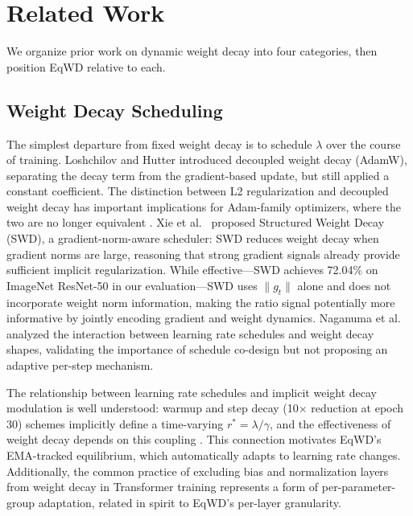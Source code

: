 \documentclass{article}
\begin{document}
\section{Related Work}
\label{sec:related}

We organize prior work on dynamic weight decay into four categories,
then position EqWD relative to each.

\subsection{Weight Decay Scheduling}
\label{sec:related_scheduling}

The simplest departure from fixed weight decay is to schedule
$\lambda$ over the course of training. Loshchilov and Hutter
\citep{loshchilov2019adamw} introduced decoupled weight decay (AdamW),
separating the decay term from the gradient-based update, but still
applied a constant coefficient. The distinction between L2
regularization and decoupled weight decay has important implications for
Adam-family optimizers, where the two are no longer equivalent
\citep{loshchilov2019adamw}. Xie et al.~\citep{xie2023swd} proposed
Structured Weight Decay (SWD), a gradient-norm-aware scheduler: SWD
reduces weight decay when gradient norms are large, reasoning that
strong gradient signals already provide sufficient implicit
regularization. While effective---SWD achieves 72.04\% on ImageNet
ResNet-50 in our evaluation---SWD uses $\|g_t\|$ alone and does not
incorporate weight norm information, making the ratio signal potentially
more informative by jointly encoding gradient and weight dynamics.
Naganuma et al.~\citep{naganuma2026} analyzed the interaction between
learning rate schedules and weight decay shapes, validating the
importance of schedule co-design but not proposing an adaptive per-step
mechanism.

The relationship between learning rate schedules and implicit weight
decay modulation is well understood: warmup and step decay (10$\times$ reduction at epoch 30) schemes
implicitly define a time-varying $r^* = \lambda/\gamma$, and the
effectiveness of weight decay depends on this coupling
\citep{gotmare2018, smith2019superconv}. This connection motivates EqWD's
EMA-tracked equilibrium, which automatically adapts to learning rate
changes. Additionally, the common practice of excluding bias and
normalization layers from weight decay in Transformer training
\citep{devlin2019bert, dosovitskiy2021vit} represents a form of
per-parameter-group adaptation, related in spirit to EqWD's per-layer
granularity.
\end{document}
